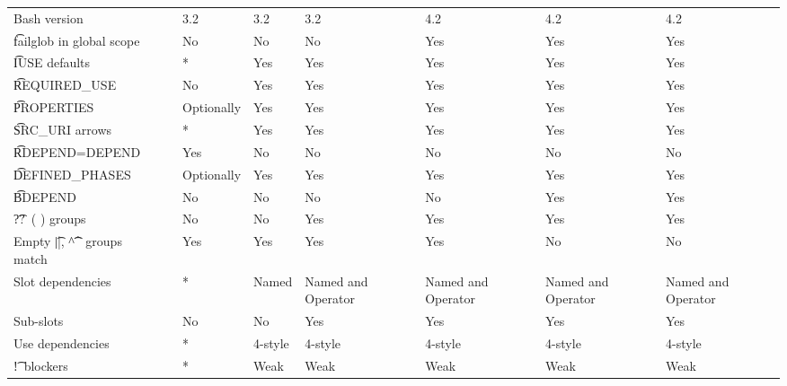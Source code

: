 \begin{landscape}
\begin{longtable}{llP{7.5em}P{7.5em}P{7.5em}P{7.5em}P{7.5em}P{7.5em}}
Bash version &  &
    3.2 & 3.2 & 3.2 & 4.2 & 4.2 & 4.2 \\

\t{failglob} in global scope &  &
    No & No & No & Yes & Yes & Yes \\

\t{IUSE} defaults &  &
    * & Yes & Yes & Yes & Yes & Yes \\

\t{REQUIRED_USE} &  &
    No & Yes & Yes & Yes & Yes & Yes \\

\t{PROPERTIES} &  &
    Optionally & Yes & Yes & Yes & Yes & Yes \\

\t{SRC_URI} arrows &  &
    * & Yes & Yes & Yes & Yes & Yes \\

\t{RDEPEND=DEPEND} &  &
    Yes & No & No & No & No & No \\

\t{DEFINED_PHASES} &  &
    Optionally & Yes & Yes & Yes & Yes & Yes \\

\t{BDEPEND} &  &
    No & No & No & No & Yes & Yes \\

\t{??\ ( )} groups &  &
    No & No & Yes & Yes & Yes & Yes \\

Empty \t{||}, \t{\textasciicircum\textasciicircum} groups match &
     &
    Yes & Yes & Yes & Yes & No & No \\

Slot dependencies &  &
    * & Named & Named and Operator & Named and Operator & Named and Operator & Named and Operator \\

Sub-slots &  &
    No & No & Yes & Yes & Yes & Yes \\

Use dependencies &  &
    * & 4-style & 4-style & 4-style & 4-style & 4-style \\

\t{!}\ blockers &  &
    * & Weak & Weak & Weak & Weak & Weak \\


\end{longtable}
\end{landscape}
